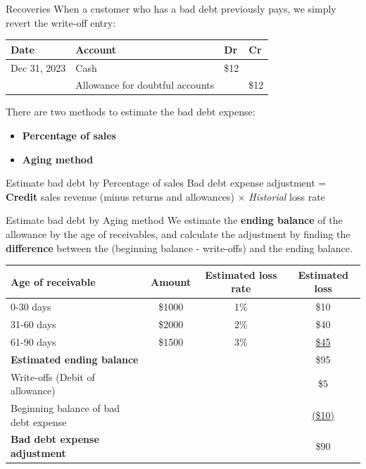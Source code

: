 \begin{knBox}
    {Recoveries}
    When a customer who has a bad debt previously pays, we simply revert the write-off entry:

    \vspace{1em}

    \begin{tabular}{llll}
        \textbf{Date} & \textbf{Account}      & \textbf{Dr} & \textbf{Cr} \\
        \hline
        Dec 31, 2023  & Cash & \$12        &             \\
                      & \quad Allowance for doubtful accounts &             & \$12         \\
    \end{tabular}
\end{knBox}

There are two methods to estimate the bad debt expense:
\begin{itemize}
    \item \textbf{Percentage of sales}
    \item \textbf{Aging method}
\end{itemize}
\label{thm:bad_debt_est}

\begin{theorem}
    {Estimate bad debt by Percentage of sales}
    Bad debt expense adjustment = \textbf{Credit} sales revenue (minus returns and allowances) $\times$ \textit{Historial} loss rate
\end{theorem}

\begin{theorem}
    {Estimate bad debt by Aging method}
    We estimate the \textbf{ending balance} of the allowance by the age of receivables, and calculate the adjustment by finding the \textbf{difference} between the (beginning balance - write-offs) and the ending balance.

    \begin{tabular}{lccc}
        \textbf{Age of receivable} & \textbf{Amount} & \textbf{Estimated loss rate} & \textbf{Estimated loss} \\
        \hline
        0-30 days & \$1000 & 1\% & \$10 \\
        31-60 days & \$2000 & 2\% & \$40 \\
        61-90 days & \$1500 & 3\% & \underline{\$45} \\
        \textbf{Estimated ending balance} &  &  & \$95 \\
        Write-offs (Debit of allowance) &  &  & \$5 \\
        Beginning balance of bad debt expense &  &  & \underline{(\$10)} \\
        \textbf{Bad debt expense adjustment} &  &  & \$90 \\
    \end{tabular}
\end{theorem}

